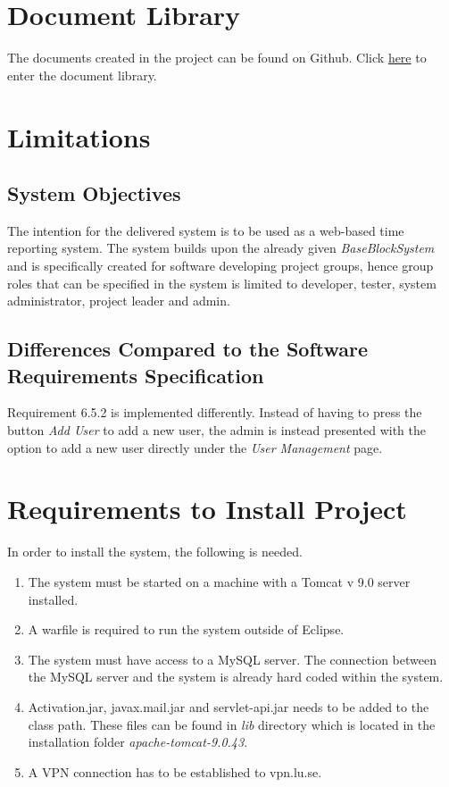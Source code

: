 \documentclass{article}
\begin{document}
     

\section{Document Library}
The documents created in the project can be found on Github. Click \href{https://github.com/puspgroup2/document-library/tree/master/Documents}{here} to enter the document library. \\ 

\section{Limitations}


\subsection{System Objectives}
The intention for the delivered system is to be used as a web-based time reporting system. The system builds upon the already given \textit{BaseBlockSystem} and is specifically created for software developing project groups, hence group roles that can be specified in the system is limited to developer, tester, system administrator, project leader and admin.

\subsection{Differences Compared to the Software Requirements Specification}
Requirement 6.5.2 is implemented differently. Instead of having to press  the button \textit{Add User} to add a new user, the admin is instead presented with the option to add a new user directly under the \textit{User Management} page.


\section{Requirements to Install Project}
In order to install the system, the following is needed.
\begin{enumerate}

    \item The system must be started on a machine with a Tomcat v 9.0 server installed.
    
    \item A warfile is required to run the system outside of Eclipse.
    
    \item  The system must have access to a MySQL server. The connection between the MySQL server and the system is already hard coded within the system.
    
    \item Activation.jar, javax.mail.jar and servlet-api.jar needs to be added to the class path. These files can be found in \textit{lib} directory which is located in the installation folder \textit{apache-tomcat-9.0.43}.
    
    \item A VPN connection has to be established to vpn.lu.se.
    
    
    \end{enumerate}
    
\end{document}
